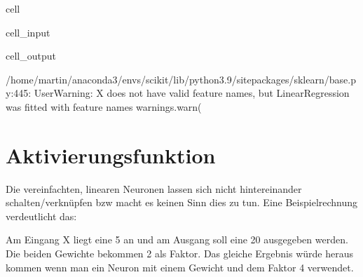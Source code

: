 \documentclass[letterpaper,10pt,english]{jupyterBook}
\begin{document}
\begin{sphinxuseclass}{cell}\begin{sphinxVerbatimInput}

\begin{sphinxuseclass}{cell_input}
\begin{sphinxVerbatim}[commandchars=\\\{\}]
\PYG{p}{[}
    \PYG{p}{[}  \PYG{p}{]}
\PYG{p}{]}
\end{sphinxVerbatim}

\end{sphinxuseclass}\end{sphinxVerbatimInput}
\begin{sphinxVerbatimOutput}

\begin{sphinxuseclass}{cell_output}
\begin{sphinxVerbatim}[commandchars=\\\{\}]
[13.98766161]
\end{sphinxVerbatim}

\begin{sphinxVerbatim}[commandchars=\\\{\}]
/home/martin/anaconda3/envs/scikit/lib/python3.9/site\PYGZhy{}packages/sklearn/base.py:445: UserWarning: X does not have valid feature names, but LinearRegression was fitted with feature names
  warnings.warn(
\end{sphinxVerbatim}

\end{sphinxuseclass}\end{sphinxVerbatimOutput}

\end{sphinxuseclass}

\chapter{Aktivierungsfunktion}
\label{\detokenize{02_NN/einzelnes_neuron:aktivierungsfunktion}}
\sphinxAtStartPar
{}

\sphinxAtStartPar
Die vereinfachten, linearen Neuronen lassen sich nicht hintereinander schalten/verknüpfen bzw macht es keinen Sinn dies zu tun. Eine Beispielrechnung verdeutlicht das:

\sphinxAtStartPar
{}
Am Eingang X liegt eine 5 an und am Ausgang soll eine 20 ausgegeben werden. Die beiden Gewichte bekommen 2 als Faktor. Das gleiche Ergebnis würde heraus kommen wenn man ein Neuron mit einem Gewicht und dem Faktor 4 verwendet.
\end{document}
